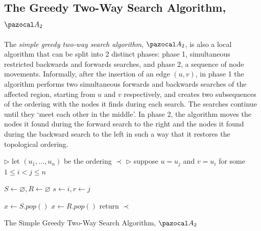 \documentclass{report}
\begin{document}
\subsection{The Greedy Two-Way Search Algorithm, $\pazocal A_2$}

The \textit{simple greedy two-way search algorithm}, $\pazocal A_2$, is also a local algorithm that can be split into 2 distinct phases: phase 1, simultaneous restricted backwards and forwards searches, and phase 2, a sequence of node movements. Informally, after the insertion of an edge $(u,v)$, in phase 1 the algorithm performs two simultaneous forwards and backwards searches of the affected region, starting from $u$ and $v$ respectively, and creates two subsequences of the ordering with the nodes it finds during each search. The searches continue until they `meet each other in the middle'. In phase 2, the algorithm moves the nodes it found during the forward search to the right and the nodes it found during the backward search to the left in such a way that it restores the topological ordering.

\begin{algorithm}[H]\label{twoway}
    \SetAlgoLined
    
    
    $\triangleright$ let $(u_1,...,u_n)$ be the ordering $\prec$\;
    $\triangleright$ suppose $u = u_j$ and $v=u_i$ for some $1 \leq i < j \leq n$\;
    
    $S \leftarrow \varnothing, R \leftarrow \varnothing$\;
    $s \leftarrow i, r \leftarrow j$\;
    
    $x \leftarrow S.pop()$\;
    $x \leftarrow R.pop()$\;
    return $\prec$\;
    \caption{The Simple Greedy Two-Way Search Algorithm, $\pazocal A_2$}
\end{algorithm}
\end{document}
